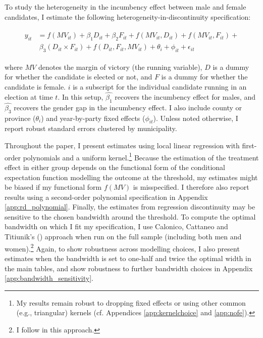 \documentclass[12pt]{article}
\begin{document}
To study the heterogeneity in the incumbency effect between male and female candidates, I estimate the following heterogeneity-in-discontinuity specification:

\begin{align}
\begin{split}
    y_{it} & = f(MV_{it}) + \beta_1 D_{it} + \beta_2 F_{it} + f(MV_{it}, D_{it}) + f(MV_{it}, F_{it}) +  \\
    &  \ \beta_3 (D_{it} \times F_{it}) + f(D_{it}, F_{it}, MV_{it}) + \theta_{i} + \phi_{it} + \epsilon_{it}
\end{split}
\end{align}

\noindent where $MV$ denotes the margin of victory (the running variable), $D$ is a dummy for whether the candidate is elected or not, and $F$ is a dummy for whether the candidate is female. $i$ is a subscript for the individual candidate running in an election at time $t$. In this setup, $\hat{\beta_1}$ recovers the incumbency effect for males, and $\hat{\beta_3}$ recovers the gender gap in the incumbency effect.
I also include county or province ($\theta_i$) and year-by-party fixed effects ($\phi_{it}$). Unless noted otherwise, I report robust standard errors clustered by municipality.

Throughout the paper, I present estimates using local linear regression with first-order polynomials \citep[cf.][]{gelman2018} and a uniform kernel.\footnote{My results remain robust to dropping fixed effects or using other common (e.g., triangular) kernels (cf. Appendices \ref{app:kernelchoice} and \ref{app:nofe}).} Because the estimation of the treatment effect in either group depends on the functional form of the conditional expectation function modelling the outcome at the threshold, my estimates might be biased if my functional form $f(MV)$ is misspecified. I therefore also report results using a second-order polynomial specification in Appendix \ref{app:rd_polynomial}. Finally, the estimates from regression discontinuity may be sensitive to the chosen bandwidth around the threshold. To compute the optimal bandwidth on which I fit my specification, I use Calonico, Cattaneo and Titiunik's (\citeyear{calonico2014}) approach when run on the full sample (including both men and women).\footnote{I follow \citet{cipullo2021} in this approach.} Again, to show robustness across modelling choices, I also present estimates when the bandwidth is set to one-half and twice the optimal width in the main tables, and show robustness to further bandwidth choices in Appendix \ref{app:bandwidth_sensitivity}.
\end{document}
